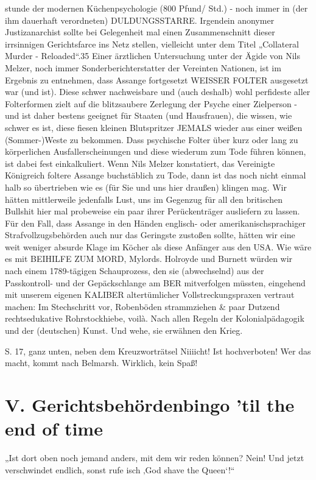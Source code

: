 \begin{multicols}{2}
stunde der modernen Küchenpsychologie (800 Pfund/
Std.) - noch immer in (der ihm dauerhaft verordneten)
DULDUNGSSTARRE.
Irgendein anonymer Justizanarchist sollte bei Gelegenheit mal einen Zusammenschnitt dieser irrsinnigen Gerichtsfarce ins Netz stellen, vielleicht unter dem Titel
„Collateral Murder - Reloaded“.35
Einer ärztlichen Untersuchung unter der Ägide von Nils
Melzer, noch immer Sonderberichterstatter der Vereinten Nationen, ist im Ergebnis zu entnehmen, dass Assange fortgesetzt WEISSER FOLTER ausgesetzt war (und
ist). Diese schwer nachweisbare und (auch deshalb)
wohl perfideste aller Folterformen zielt auf die blitzsaubere Zerlegung der Psyche einer Zielperson - und ist daher bestens geeignet für Staaten (und Hausfrauen), die
wissen, wie schwer es ist, diese fiesen kleinen Blutspritzer JEMALS wieder aus einer weißen (Sommer-)Weste zu
bekommen. Dass psychische Folter über kurz oder lang
zu körperlichen Ausfallerscheinungen und diese wiederum zum Tode führen können, ist dabei fest einkalkuliert.
Wenn Nils Melzer konstatiert, das Vereinigte Königreich
foltere Assange buchstäblich zu Tode, dann ist das noch
nicht einmal halb so übertrieben wie es (für Sie und uns
hier draußen) klingen mag.
Wir hätten mittlerweile jedenfalls Lust, uns im Gegenzug für all den britischen Bullshit hier mal probeweise
ein paar ihrer Perückenträger ausliefern zu lassen. Für
den Fall, dass Assange in den Händen englisch- oder
amerikanischsprachiger Strafvollzugsbehörden auch
nur das Geringste zustoßen sollte, hätten wir eine weit
weniger absurde Klage im Köcher als diese Anfänger
aus den USA. Wie wäre es mit BEIHILFE ZUM MORD,
Mylords. Holroyde und Burnett würden wir nach einem
1789-tägigen Schauprozess, den sie (abwechselnd) aus
der Passkontroll- und der Gepäckschlange am BER mitverfolgen müssten, eingehend mit unserem eigenen KALIBER altertümlicher Vollstreckungspraxen vertraut machen: Im Stechschritt vor, Robenböden strammziehen
\& paar Dutzend rechtsedukative Rohrstockhiebe, voilà.
Nach allen Regeln der Kolonialpädagogik und der (deutschen) Kunst.
Und wehe, sie erwähnen den Krieg.

S. 17, ganz unten, neben dem Kreuzworträtsel
Niiiicht! Ist hochverboten! Wer das macht, kommt nach Belmarsh. Wirklich, kein Spaß!

\section{V. Gerichtsbehördenbingo ’til the end of time}
\epigraph{„Ist dort oben noch jemand anders, mit dem wir reden können?
Nein! Und jetzt verschwindet endlich, sonst rufe isch ‚God shave the Queen‘!“}{}


\end{multicols}

